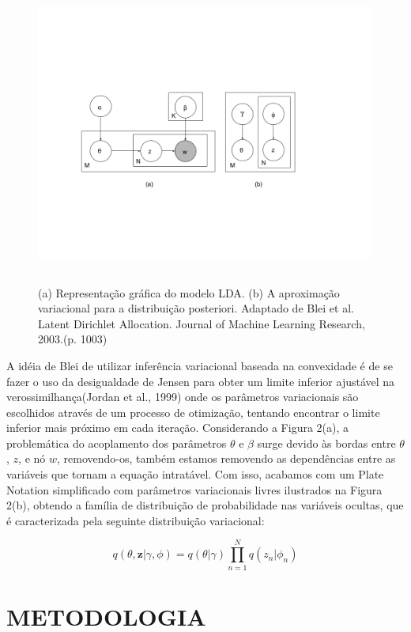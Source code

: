 \documentclass[12pt,a4paper]{article}
\begin{document}
  
  \begin{figure}[h]
    \centering
      \includegraphics[height=10cm]{images/figure_2.png}
      \caption{(a) Representação gráfica do modelo LDA. (b) A aproximação variacional para a distribuição posteriori. Adaptado de Blei et al. Latent Dirichlet Allocation. Journal of Machine Learning Research, 2003.(p. 1003)}
  \end{figure}
  
  A idéia de Blei de utilizar inferência variacional baseada na convexidade é de se fazer o uso da desigualdade de Jensen para obter um limite inferior ajustável na verossimilhança(Jordan et al., 1999) onde os parâmetros variacionais são escolhidos através de um processo de otimização, tentando encontrar o limite inferior mais próximo em cada iteração. Considerando a Figura 2(a), a problemática do acoplamento dos parâmetros $\theta$ e $\beta$ surge devido às bordas entre $\theta$, $z$, e nó $w$, removendo-os, também estamos removendo as dependências entre as variáveis que tornam a equação intratável. Com isso, acabamos com um Plate Notation simplificado com parâmetros variacionais livres ilustrados na Figura 2(b), obtendo a família de distribuição de probabilidade nas variáveis ocultas, que é caracterizada pela seguinte distribuição variacional:
  
  \begin{equation}
  q(\theta,\textbf{z}|\gamma,\phi)=q(\theta|\gamma)\prod_{n=1}^{N}q(z_n|\phi_n)
  \end{equation}
  
  \section{METODOLOGIA}
  
\end{document}
